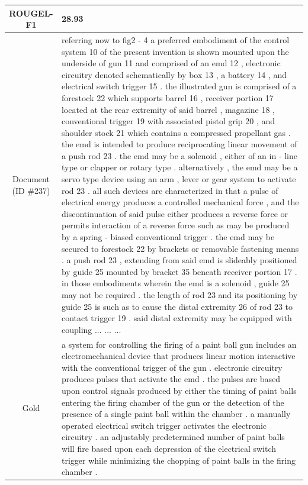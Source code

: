 \begin{table}[bth!]
\begin{tabular}{c|p{}}
\\ \hline
ROUGEL-F1 & 
28.93
\\ \hline
\makecell{Document\\(ID \#237)} & 
referring now to fig2 - 4 a preferred embodiment of the control system 10 of the present invention is shown mounted upon the underside of gun 11 and comprised of an emd 12 , electronic circuitry denoted schematically by box 13 , a battery 14 , and electrical switch trigger 15 . the illustrated gun is comprised of a forestock 22 which supports barrel 16 , receiver portion 17 located at the rear extremity of said barrel , magazine 18 , conventional trigger 19 with associated pistol grip 20 , and shoulder stock 21 which contains a compressed propellant gas . the emd is intended to produce reciprocating linear movement of a push rod 23 . the emd may be a solenoid , either of an in - line type or clapper or rotary type . alternatively , the emd may be a servo type device using an arm , lever or gear system to activate rod 23 . all such devices are characterized in that a pulse of electrical energy produces a controlled mechanical force , and the discontinuation of said pulse either produces a reverse force or permits interaction of a reverse force such as may be produced by a spring - biased conventional trigger . the emd may be secured to forestock 22 by brackets or removable fastening means . a push rod 23 , extending from said emd is slideably positioned by guide 25 mounted by bracket 35 beneath receiver portion 17 . in those embodiments wherein the emd is a solenoid , guide 25 may not be required . the length of rod 23 and its positioning by guide 25 is such as to cause the distal extremity 26 of rod 23 to contact trigger 19 . said distal extremity may be equipped with coupling ... ... ... 
\\ \hline
Gold & 
a system for controlling the firing of a paint ball gun includes an electromechanical device that produces linear motion interactive with the conventional trigger of the gun . electronic circuitry produces pulses that activate the emd . the pulses are based upon control signals produced by either the timing of paint balls entering the firing chamber of the gun or the detection of the presence of a single paint ball within the chamber . a manually operated electrical switch trigger activates the electronic circuitry . an adjustably predetermined number of paint balls will fire based upon each depression of the electrical switch trigger while minimizing the chopping of paint balls in the firing chamber .
\\ \hline

\end{tabular}
\end{table}
